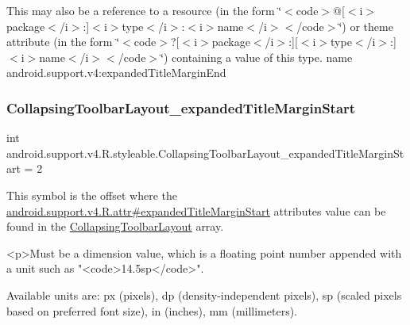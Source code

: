This may also be a reference to a resource (in the form \char`\"{}$<$code$>$@\mbox{[}$<$i$>$package$<$/i$>$\+:\mbox{]}$<$i$>$type$<$/i$>$\+:$<$i$>$name$<$/i$>$$<$/code$>$\char`\"{}) or theme attribute (in the form \char`\"{}$<$code$>$?\mbox{[}$<$i$>$package$<$/i$>$\+:\mbox{]}\mbox{[}$<$i$>$type$<$/i$>$\+:\mbox{]}$<$i$>$name$<$/i$>$$<$/code$>$\char`\"{}) containing a value of this type.  name android.\+support.\+v4\+:expanded\+Title\+Margin\+End \mbox{\label{classandroid_1_1support_1_1v4_1_1R_1_1styleable_a5f942ec17cd01a93f6b3ce569421954b}} 
\subsubsection{\texorpdfstring{Collapsing\+Toolbar\+Layout\+\_\+expanded\+Title\+Margin\+Start}{CollapsingToolbarLayout\_expandedTitleMarginStart}}
{\footnotesize\ttfamily int android.\+support.\+v4.\+R.\+styleable.\+Collapsing\+Toolbar\+Layout\+\_\+expanded\+Title\+Margin\+Start = 2\hspace{0.3cm}{\ttfamily [static]}}

This symbol is the offset where the \hyperlink{classandroid_1_1support_1_1v4_1_1R_1_1attr_a2081b8dc1c473ecad9c64a00841c4d5c}{android.\+support.\+v4.\+R.\+attr\#expanded\+Title\+Margin\+Start} attribute\textquotesingle{}s value can be found in the \hyperlink{classandroid_1_1support_1_1v4_1_1R_1_1styleable_a91b20e27088c910353d38c1efde32aa9}{Collapsing\+Toolbar\+Layout} array.

\begin{DoxyVerb}      <p>Must be a dimension value, which is a floating point number appended with a unit such as "<code>14.5sp</code>".
\end{DoxyVerb}
 Available units are\+: px (pixels), dp (density-\/independent pixels), sp (scaled pixels based on preferred font size), in (inches), mm (millimeters). 

